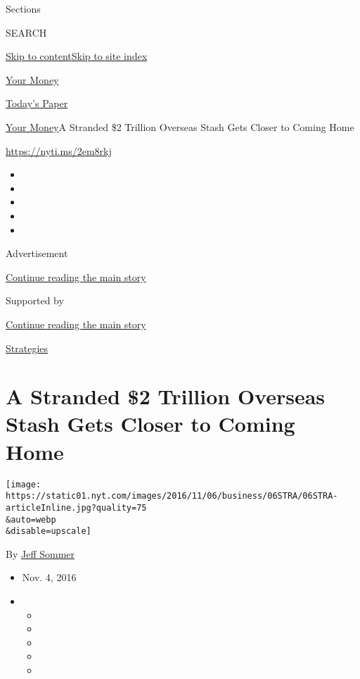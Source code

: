Sections

SEARCH

\protect\hyperlink{site-content}{Skip to
content}\protect\hyperlink{site-index}{Skip to site index}

\href{https://www.nytimes.com/section/your-money}{Your Money}

\href{https://myaccount.nytimes.com/auth/login?response_type=cookie\&client_id=vi}{}

\href{https://www.nytimes.com/section/todayspaper}{Today's Paper}

\href{/section/your-money}{Your Money}\textbar{}A Stranded \$2 Trillion
Overseas Stash Gets Closer to Coming Home

\url{https://nyti.ms/2em8rkj}

\begin{itemize}
\item
\item
\item
\item
\item
\end{itemize}

Advertisement

\protect\hyperlink{after-top}{Continue reading the main story}

Supported by

\protect\hyperlink{after-sponsor}{Continue reading the main story}

\href{/column/business-strategies}{Strategies}

\hypertarget{a-stranded-2-trillion-overseas-stash-gets-closer-to-coming-home}{%
\section{A Stranded \$2 Trillion Overseas Stash Gets Closer to Coming
Home}\label{a-stranded-2-trillion-overseas-stash-gets-closer-to-coming-home}}

\texttt{[image: https://static01.nyt.com/images/2016/11/06/business/06STRA/06STRA-articleInline.jpg?quality=75\\\&auto=webp\\\&disable=upscale]}

By \href{https://www.nytimes.com/by/jeff-sommer}{Jeff Sommer}

\begin{itemize}
\item
  Nov. 4, 2016
\item
  \begin{itemize}
  \item
  \item
  \item
  \item
  \item
  \end{itemize}
\end{itemize}

